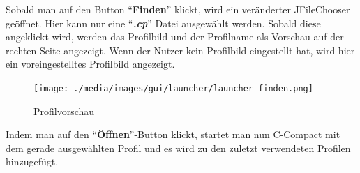 Sobald man auf den Button "`\textbf{Finden}"' klickt, wird ein veränderter JFileChooser geöffnet. Hier kann nur eine "`\textit{\textbf{.cp}}"' Datei ausgewählt werden. Sobald diese angeklickt wird, werden das Profilbild und der Profilname als Vorschau auf der rechten Seite angezeigt. Wenn der Nutzer kein Profilbild eingestellt hat, wird hier ein voreingestelltes Profilbild angezeigt.

\begin{figure}[h] 
   \centering
     \texttt{[image: ./media/images/gui/launcher/launcher\_finden.png]}
  \caption{ Profilvorschau}
  \label{fig:Bild1}
\end{figure}

Indem man auf den "`\textbf{Öffnen}"'-Button klickt, startet man nun C-Compact mit dem gerade ausgewählten Profil und es wird zu den zuletzt verwendeten Profilen hinzugefügt.
